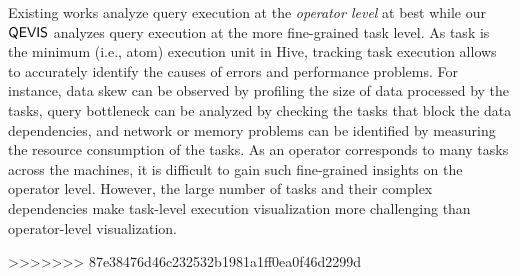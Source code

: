 Existing works analyze query execution at the \textit{operator level} at best while our $\mathsf{QEVIS}$ analyzes query execution at the more fine-grained task level. As task is the minimum (i.e., atom) execution unit in Hive, tracking task execution allows to accurately identify the causes of errors and performance problems. For instance, data skew can be observed by profiling the size of data processed by the tasks, query bottleneck can be analyzed by checking the tasks that block the data dependencies, and network or memory problems can be identified by measuring the resource consumption of the tasks. As an operator corresponds to many tasks across the machines, it is difficult to gain such fine-grained insights on the operator level. However, the large number of tasks and their complex dependencies make task-level execution visualization more challenging than operator-level visualization.


>>>>>>> 87e38476d46c232532b1981a1ff0ea0f46d2299d







